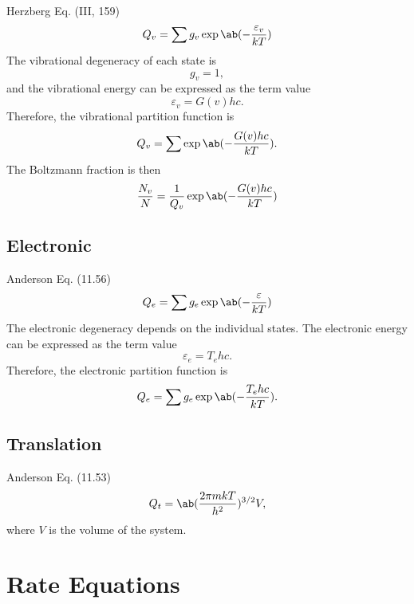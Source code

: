 \documentclass[11pt, twoside, fleqn]{report}
\begin{document}
Herzberg Eq. (III, 159)
\begin{equation*}
    Q_{v} = \sum g_{v}\exp\ab(-\frac{\varepsilon_{v}}{kT})
\end{equation*}
The vibrational degeneracy of each state is
\begin{equation*}
    g_{v} = 1,
\end{equation*}
and the vibrational energy can be expressed as the term value
\begin{equation*}
    \varepsilon_{v} = G(v)hc.
\end{equation*}
Therefore, the vibrational partition function is
\begin{equation*}
    Q_{v} = \sum \exp\ab(-\frac{G(v)hc}{kT}).
\end{equation*}
The Boltzmann fraction is then
\begin{equation*}
    \frac{N_{v}}{N} = \frac{1}{Q_{v}}\exp\ab(-\frac{G(v)hc}{kT})
\end{equation*}

\subsection{Electronic}

Anderson Eq. (11.56)
\begin{equation*}
    Q_{e} = \sum g_{e}\exp\ab(-\frac{\varepsilon}{kT})
\end{equation*}
The electronic degeneracy depends on the individual states. The electronic energy can be expressed as the term value
\begin{equation*}
    \varepsilon_{e} = T_{e}hc.
\end{equation*}
Therefore, the electronic partition function is
\begin{equation*}
    Q_{e} = \sum g_{e}\exp\ab(-\frac{T_{e}hc}{kT}).
\end{equation*}

\subsection{Translation}

Anderson Eq. (11.53)
\begin{equation*}
    Q_{t} = \ab(\frac{2\pi mkT}{h^{2}})^{3/2}V,
\end{equation*}
where $V$ is the volume of the system.

\section{Rate Equations}
\end{document}
